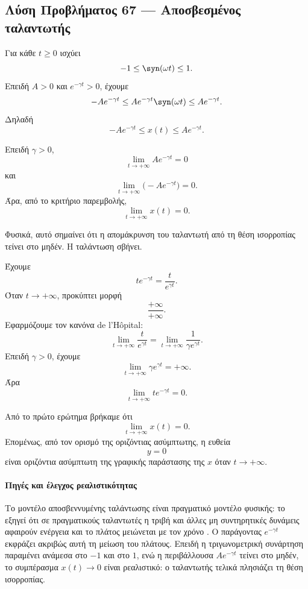 \subsection*{Λύση Προβλήματος 67 --- Αποσβεσμένος ταλαντωτής}

\begin{alist}
  \item Για κάθε \(t\geq0\) ισχύει
        \[
          -1\leq \syn(\omega t)\leq1.
        \]
        Επειδή \(A>0\) και \(e^{-\gamma t}>0\), έχουμε
        \[
          -Ae^{-\gamma t}
          \leq
          Ae^{-\gamma t}\syn(\omega t)
          \leq
          Ae^{-\gamma t}.
        \]
        Δηλαδή
        \[
          -Ae^{-\gamma t}\leq x(t)\leq Ae^{-\gamma t}.
        \]

        Επειδή \(\gamma>0\),
        \[
          \lim_{t\to+\infty}Ae^{-\gamma t}=0
        \]
        και
        \[
          \lim_{t\to+\infty}\bigl(-Ae^{-\gamma t}\bigr)=0.
        \]
        Άρα, από το κριτήριο παρεμβολής,
        \[
          {\lim_{t\to+\infty}x(t)=0}.
        \]

        Φυσικά, αυτό σημαίνει ότι η απομάκρυνση του ταλαντωτή από τη
        θέση ισορροπίας τείνει στο μηδέν. Η ταλάντωση σβήνει.

  \item Έχουμε
        \[
          t e^{-\gamma t}=\frac{t}{e^{\gamma t}}.
        \]
        Όταν \(t\to+\infty\), προκύπτει μορφή
        \[
          \frac{+\infty}{+\infty}.
        \]
        Εφαρμόζουμε τον κανόνα de l'H\^opital:
        \[
          \lim_{t\to+\infty}\frac{t}{e^{\gamma t}}
          =
          \lim_{t\to+\infty}\frac{1}{\gamma e^{\gamma t}}.
        \]
        Επειδή \(\gamma>0\), έχουμε
        \[
          \lim_{t\to+\infty}\gamma e^{\gamma t}=+\infty.
        \]
        Άρα
        \[
          {
          \lim_{t\to+\infty}t e^{-\gamma t}=0
          }.
        \]

  \item Από το πρώτο ερώτημα βρήκαμε ότι
        \[
          \lim_{t\to+\infty}x(t)=0.
        \]
        Επομένως, από τον ορισμό της οριζόντιας ασύμπτωτης, η ευθεία
        \[
          {y=0}
        \]
        είναι οριζόντια ασύμπτωτη της γραφικής παράστασης της \(x\)
        όταν \(t\to+\infty\).
\end{alist}

\paragraph{Πηγές και έλεγχος ρεαλιστικότητας}
Το μοντέλο αποσβεννυμένης ταλάντωσης είναι πραγματικό μοντέλο φυσικής:
το  εξηγεί ότι σε πραγματικούς ταλαντωτές
η τριβή και άλλες μη συντηρητικές δυνάμεις αφαιρούν ενέργεια και το
πλάτος μειώνεται με τον χρόνο \cite{openstaxCollegePhysicsDampedMotion}.
Ο παράγοντας \(e^{-\gamma t}\) εκφράζει ακριβώς αυτή τη μείωση του
πλάτους. Επειδή η τριγωνομετρική συνάρτηση παραμένει ανάμεσα στο
\(-1\) και στο \(1\), ενώ η περιβάλλουσα \(Ae^{-\gamma t}\) τείνει στο
μηδέν, το συμπέρασμα \(x(t)\to0\) είναι ρεαλιστικό: ο ταλαντωτής
τελικά πλησιάζει τη θέση ισορροπίας.

